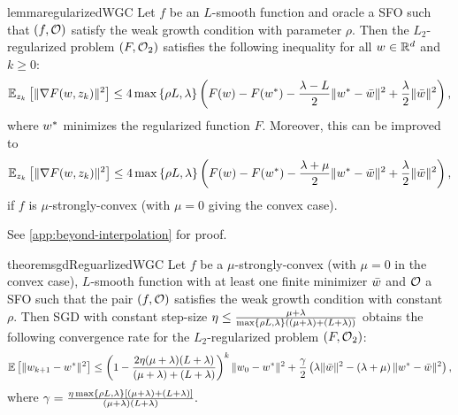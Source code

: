 \begin{restatable}{lemma}{regularizedWGC}\label{lemma:regularized-wgc}
    Let \( f \) be an \( L \)-smooth function and oracle{} a SFO such that \( \rbr{f, \oracle{}} \) satisfy the weak growth condition with parameter \( \rho \).
    Then the \( L_2 \)-regularized problem \( \rbr{F, \oracle{}_2} \) satisfies the following inequality for all \( \w \in \R^d \) and \( k \geq 0 \):
    \[ \Ek\sbr{\norm{\nabla F(\w, \zk)}^2} \leq 4 \max\cbr{\rho L, \lambda} \rbr{F(\w) - F(\wopt) - \frac{\lambda - L}{2} \norm{\wopt - \wbar}^2 + \frac{\lambda}{2} \norm{\wbar}^2}, \]
    where \( \wopt \) minimizes the regularized function \( F \).
    Moreover, this can be improved to 
    \[ \Ek\sbr{\norm{\nabla F(\w, \zk)}^2} \leq 4 \max\cbr{\rho L, \lambda} \rbr{F(\w) - F(\wopt) - \frac{\lambda + \mu}{2} \norm{\wopt - \wbar}^2 + \frac{\lambda}{2} \norm{\wbar}^2}, \]
    if \( f \) is \( \mu \)-strongly-convex (with \( \mu = 0 \) giving the convex case).
\end{restatable}
See \autoref{app:beyond-interpolation} for proof.


\begin{restatable}{theorem}{sgdReguarlizedWGC}\label{thm:sgd-regularized-wgc}
    Let \( f \) be a \( \mu \)-strongly-convex (with \( \mu = 0 \) in the convex case), \( L \)-smooth function with at least one finite minimizer \( \wbar \) and \( \oracle{} \) a SFO such that the pair \( \rbr{f, \oracle{}} \) satisfies the weak growth condition with constant \( \rho \).
    Then SGD with constant step-size \( \eta \leq \frac{\mu + \lambda}{\max\cbr{\rho L, \lambda}\rbr{(\mu + \lambda) + (L + \lambda)}} \) obtains the following convergence rate for the \( L_2 \)-regularized problem \( \rbr{F, \oracle{}_2} \):
    \[  \E\sbr{\norm{\wkk - \wopt}^2} \leq \rbr{1 - \frac{2 \eta (\mu + \lambda)(L + \lambda)}{(\mu + \lambda) + (L + \lambda)}}^k \norm{\w_0 - \wopt}^2 + \frac{\gamma}{2}\rbr{\lambda \norm{\wbar}^2 - \rbr{\lambda + \mu}\norm{\wopt - \wbar}^2}, \]
    where \( \gamma = \frac{\eta \max\cbr{\rho L, \lambda} \sbr{(\mu + \lambda) + (L + \lambda)}}{(\mu + \lambda)(L + \lambda)}. \)  
\end{restatable}

